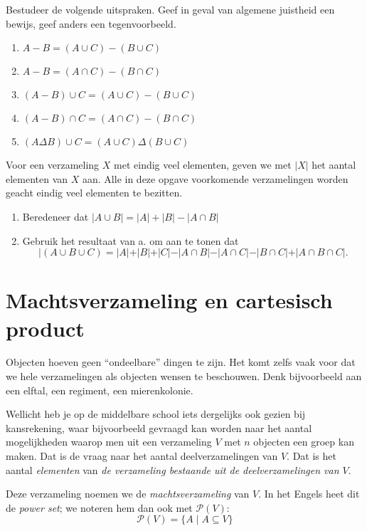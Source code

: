 \begin{exercise}
Bestudeer de volgende uitspraken. Geef in geval van algemene juistheid een bewijs, geef anders een tegenvoorbeeld.
\begin{enumerate}[label=\textit{\alph*.}]
    \item $A-B=(A\cup C)-(B\cup C)$
    \item $A-B=(A\cap C)-(B\cap C)$
    \item $(A-B)\cup C=(A\cup C)-(B\cup C)$
    \item $(A-B)\cap C=(A\cap C)-(B\cap C)$
    \item $(A\Delta B)\cup C=(A\cup C)\Delta(B\cup C)$
\end{enumerate}
\end{exercise}

\begin{exercise}
Voor een verzameling $X$ met eindig veel elementen, geven we met $|X|$ het aantal elementen van $X$ aan. Alle in deze opgave voorkomende verzamelingen worden geacht eindig veel elementen te bezitten.
\begin{enumerate}[label=\textit{\alph*.}]
    \item Beredeneer dat $|A\cup B|=|A| + |B| - |A\cap B|$
    \item Gebruik het resultaat van a. om aan te tonen dat
    $$|(A\cup B\cup C)=|A|+|B|+|C|-|A\cap B|-|A\cap C|-|B\cap C|+|A\cap B\cap C|.$$
\end{enumerate}
\end{exercise}

\section{Machtsverzameling en cartesisch product}\label{sec:power}
Objecten hoeven geen ``ondeelbare'' dingen te zijn. Het komt zelfs vaak voor dat we hele verzamelingen als objecten wensen te beschouwen. Denk bijvoorbeeld aan een elftal, een regiment, een mierenkolonie.

Wellicht heb je op de middelbare school iets dergelijks ook gezien bij kansrekening, waar bijvoorbeeld gevraagd kan worden naar het aantal mogelijkheden waarop men uit een verzameling $V$ met $n$ objecten een groep kan maken. Dat is de vraag naar het aantal deelverzamelingen van $V$. Dat is het aantal \textit{elementen} van \emph{de verzameling bestaande uit de \textit{deelverzamelingen} van $V$}.

\newcommand{\power}{\ensuremath{\mathcal{P}}}

Deze verzameling noemen we de \textit{machtsverzameling} van $V$. In het Engels heet dit de \textit{power set}; we noteren hem dan ook met $\power(V)$:
$$\power(V) = \{A\;|\; A\subseteq V\}$$

